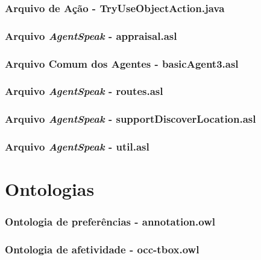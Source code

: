 \subsection*{Arquivo de Ação - TryUseObjectAction.java}


\subsection*{Arquivo \emph{AgentSpeak} - appraisal.asl}


\subsection*{Arquivo Comum dos Agentes - basicAgent3.asl}


\subsection*{Arquivo \emph{AgentSpeak} - routes.asl}


\subsection*{Arquivo \emph{AgentSpeak} - supportDiscoverLocation.asl}


\subsection*{Arquivo \emph{AgentSpeak} - util.asl}



\chapter{Ontologias}

\subsection*{Ontologia de preferências - annotation.owl}


\subsection*{Ontologia de afetividade - occ-tbox.owl}


